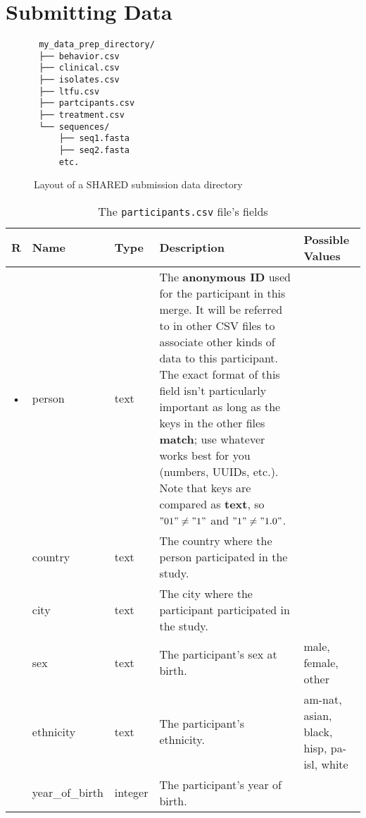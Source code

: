 \documentclass{article}
\begin{document}
\section{Submitting Data}



\begin{figure}
  \caption{Layout of a SHARED submission data directory}
  \label{fig:data-prep-dir}
\begin{verbatim}
 my_data_prep_directory/
 ├── behavior.csv
 ├── clinical.csv
 ├── isolates.csv
 ├── ltfu.csv
 ├── partcipants.csv
 ├── treatment.csv
 └── sequences/
     ├── seq1.fasta
     ├── seq2.fasta
     etc.
\end{verbatim}
\end{figure}


\begin{table}[h!]
  \centering
  \caption{The \texttt{participants.csv} file's fields}
  \label{tbl:participants.csv}
  \begin{tabular}{cllp{6cm}p{4cm}}
    R & Name            & Type      & Description & Possible Values\\ \hline
    • & person          & text    &
      The \textbf{anonymous ID} used for the participant in this
      merge. It will be referred to in other CSV files to associate
      other kinds of data to this participant. The exact format of
      this field isn't particularly important as long as the keys in
      the other files \textbf{match}; use whatever works best for you
      (numbers, UUIDs, etc.). Note that keys are compared as
      \textbf{text}, so $"01" \neq "1"$ and $"1" \neq "1.0"$. 
      \\
      & country         & text    & The country where the person participated in the study. \\
      & city            & text    & The city where the participant participated in the study. \\
      & sex             & text    & The participant's sex at birth.  & male, female, other \\
      & ethnicity       & text    & The participant's ethnicity. & am-nat, asian, black, hisp, pa-isl, white \\
      & year\_of\_birth & integer   & The participant's year of birth. \\
  \end{tabular}
\end{table}
\end{document}
